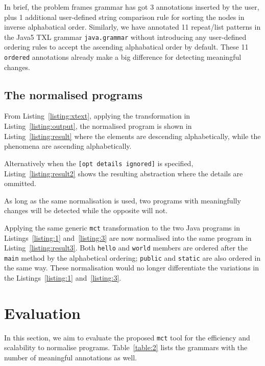 \documentclass{acm_proc_article-sp}
\begin{document}


In brief, the problem frames grammar has got 3 annotations inserted by the user, plus 1 additional user-defined string comparison rule for sorting the nodes in inverse alphabatical order. Similarly, we have annotated 11 repeat/list patterns in
the Java5 TXL grammar {\tt java.grammar} without introducing any user-defined ordering rules to accept the ascending alphabatical order by default. These 11 {\tt ordered} annotations already make a big difference for detecting meaningful changes.
\subsection{The normalised programs}
From Listing~\ref{listing:xtext}, applying the transformation in Listing~\ref{listing:output}, the normalised program is shown in Listing~\ref{listing:result} where the elements are descending alphabetically, while the phenomena are ascending alphabetically.

Alternatively when the {\tt [opt details ignored]} is specified, Listing~\ref{listing:result2} shows the resulting abstraction where the details are ommitted.

As long as the same normalisation is used, two programs with meaningfully changes will be detected while the opposite will not.

Applying the same generic {\tt mct} transformation to the two Java programs in Listings~\ref{listing:1} and~\ref{listing:3} are now normalised into the same program in Listing~\ref{listing:result3}. Both {\tt hello} and {\tt world} members are ordered after the {\tt main} method by the alphabetical ordering;  {\tt public} and {\tt static} are also ordered in the same way. These normalisation would no longer differentiate the variations in the Listings~\ref{listing:1} and~\ref{listing:3}.


\section{Evaluation}
In this section, we aim to evaluate the proposed {\tt mct} tool for the efficiency and scalability to normalise programs.
Table~\ref{table:2} lists the grammars with the number of meaningful annotations as well.
\end{document}
